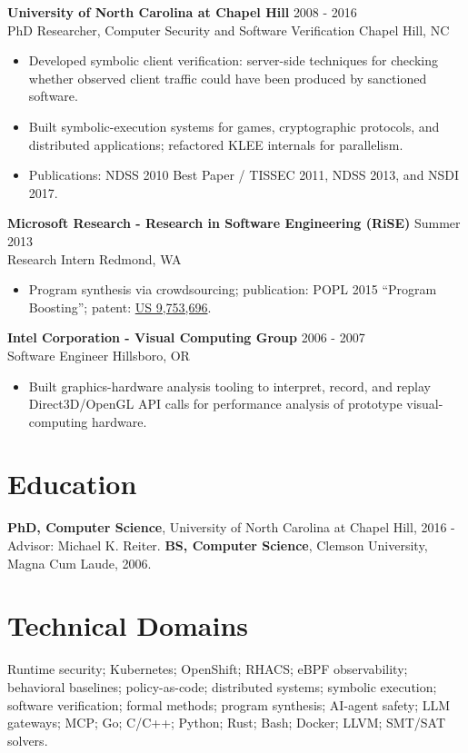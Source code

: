\documentclass[9pt,letterpaper]{extarticle}
\newcommand{\role}[4]{%
  \textbf{#1} \hfill {\small #2}\\[-1pt]
  {\small #3} \hfill {\small #4}\vspace{1pt}
}
\newcommand{\link}[2]{\href{#1}{#2}}
\begin{document}
\role{University of North Carolina at Chapel Hill}{2008 - 2016}{PhD Researcher, Computer Security and Software Verification}{Chapel Hill, NC}
\begin{itemize}
  \item Developed symbolic client verification: server-side techniques for checking whether observed client traffic could have been produced by sanctioned software.
  \item Built symbolic-execution systems for games, cryptographic protocols, and distributed applications; refactored KLEE internals for parallelism.
  \item Publications: NDSS 2010 Best Paper / TISSEC 2011, NDSS 2013, and NSDI 2017.
\end{itemize}

\role{Microsoft Research - Research in Software Engineering (RiSE)}{Summer 2013}{Research Intern}{Redmond, WA}
\begin{itemize}
  \item Program synthesis via crowdsourcing; publication: POPL 2015 ``Program Boosting''; patent: \link{https://patents.google.com/patent/US9753696B2}{US 9,753,696}.
\end{itemize}

\role{Intel Corporation - Visual Computing Group}{2006 - 2007}{Software Engineer}{Hillsboro, OR}
\begin{itemize}
  \item Built graphics-hardware analysis tooling to interpret, record, and replay Direct3D/OpenGL API calls for performance analysis of prototype visual-computing hardware.
\end{itemize}

\section*{Education}
\textbf{PhD, Computer Science}, University of North Carolina at Chapel Hill, 2016 - Advisor: Michael K. Reiter.\quad
\textbf{BS, Computer Science}, Clemson University, Magna Cum Laude, 2006.

\section*{Technical Domains}
{\small Runtime security; Kubernetes; OpenShift; RHACS; eBPF observability; behavioral baselines; policy-as-code; distributed systems; symbolic execution; software verification; formal methods; program synthesis; AI-agent safety; LLM gateways; MCP; Go; C/C++; Python; Rust; Bash; Docker; LLVM; SMT/SAT solvers.}
\end{document}
